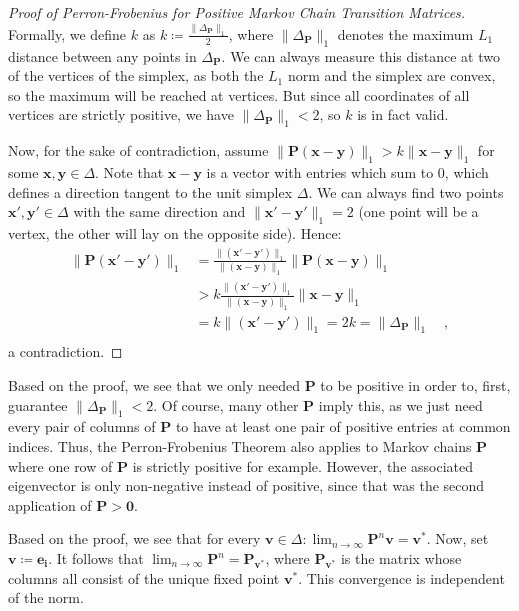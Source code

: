 \documentclass[../../main.tex]{subfiles}
\begin{document}
\begin{proof}[Proof of Perron-Frobenius for Positive Markov Chain Transition Matrices]
    Formally, we define $k$ as $k \coloneqq \frac{\|\Delta_{\bm{P}}\|_1}{2}$, where $\|\Delta_{\bm{P}}\|_1$ denotes the maximum $L_1$ distance between any points in $\Delta_{\bm{P}}$. We can always measure this distance at two of the vertices of the simplex, as both the $L_1$ norm and the simplex are convex, so the maximum will be reached at vertices. But since all coordinates of all vertices are strictly positive, we have $\|\Delta_{\bm{P}}\|_1 < 2$, so $k$ is in fact valid.

    Now, for the sake of contradiction, assume $\|\bm{P} (\bm{x} - \bm{y})\|_1 > k \|\bm{x} - \bm{y}\|_1$ for some $\bm{x}, \bm{y} \in \Delta$. Note that $\bm{x} - \bm{y}$ is a vector with entries which sum to $0$, which defines a direction tangent to the unit simplex $\Delta$. We can always find two points $\bm{x}', \bm{y}' \in \Delta$ with the same direction and $\|\bm{x}' - \bm{y}'\|_1 = 2$ (one point will be a vertex, the other will lay on the opposite side). Hence:
    \begin{align*}
        \|\bm{P} (\bm{x}' - \bm{y}')\|_1 &= \frac{\|(\bm{x}' - \bm{y}')\|_1}{\|(\bm{x} - \bm{y})\|_1} \|\bm{P} (\bm{x} - \bm{y})\|_1 \\
        &> k \frac{\|(\bm{x}' - \bm{y}')\|_1}{\|(\bm{x} - \bm{y})\|_1} \|\bm{x} - \bm{y}\|_1 \\
        &= k \|(\bm{x}' - \bm{y}')\|_1 = 2k = \|\Delta_{\bm{P}}\|_1 \quad , \\
    \end{align*}
    a contradiction.
\end{proof}

\begin{corollary}
    \label{corollary:perron_frobenius_extension}
    Based on the proof, we see that we only needed $\bm{P}$ to be positive in order to, first, guarantee $\|\Delta_{\bm{P}}\|_1 < 2$. Of course, many other $\bm{P}$ imply this, as we just need every pair of columns of $\bm{P}$ to have at least one pair of positive entries at common indices. Thus, the Perron-Frobenius Theorem also applies to Markov chains $\bm{P}$ where one row of $\bm{P}$ is strictly positive for example. However, the associated eigenvector is only non-negative instead of positive, since that was the second application of $\bm{P} > \bm{0}$.
\end{corollary}

\begin{corollary}
    Based on the proof, we see that for every $\bm{v} \in \Delta: \lim_{n \to \infty} \bm{P}^n \bm{v} = \bm{v}^*$. Now, set $\bm{v} \coloneqq \bm{e_i}$. It follows that $\lim_{n \to \infty} \bm{P}^n = \bm{P}_{\bm{v}^*}$, where $\bm{P}_{\bm{v}^*}$ is the matrix whose columns all consist of the unique fixed point $\bm{v}^*$. This convergence is independent of the norm.
\end{corollary}
\end{document}
